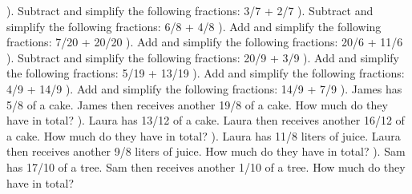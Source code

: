 \documentclass{article}%
\begin{document}
). Subtract and simplify the following fractions: 3/7 + 2/7%
\newline%
\newline%
). Subtract and simplify the following fractions: 6/8 + 4/8%
\newline%
\newline%
). Add and simplify the following fractions: 7/20 + 20/20%
\newline%
\newline%
). Add and simplify the following fractions: 20/6 + 11/6%
\newline%
\newline%
). Subtract and simplify the following fractions: 20/9 + 3/9%
\newline%
\newline%
). Add and simplify the following fractions: 5/19 + 13/19%
\newline%
\newline%
). Add and simplify the following fractions: 4/9 + 14/9%
\newline%
\newline%
). Add and simplify the following fractions: 14/9 + 7/9%
\newline%
\newline%
). James has 5/8 of a cake. James then receives another 19/8 of a cake. How much do they have in total?%
\newline%
\newline%
). Laura has 13/12 of a cake. Laura then receives another 16/12 of a cake. How much do they have in total?%
\newline%
\newline%
). Laura has 11/8 liters of juice. Laura then receives another 9/8 liters of juice. How much do they have in total?%
\newline%
\newline%
). Sam has 17/10 of a tree. Sam then receives another 1/10 of a tree. How much do they have in total?%
\end{document}
